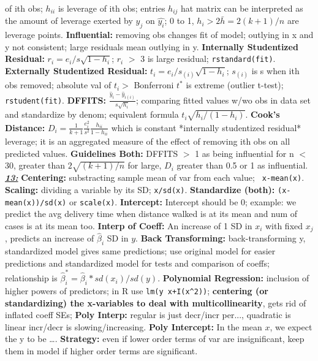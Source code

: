 \documentclass[8pt]{extarticle}
\begin{document}
of ith obs; $h_{ii}$ is leverage of ith obs; entries $h_{ij}$ hat matrix can be 
interpreted as the amount of leverage exerted by $y_j$ on $\hat{y_i}$; 
0 to 1, $h_i > 2\bar{h} = 2(k+1)/n$ are leverage points.
\textbf{Influential:} removing obs changes fit of model; outlying in x and y not
consistent; large residuals mean outlying in y.
\textbf{Internally Studentized Residual:} $r_i = e_i / s\sqrt{1 - h_{i}}$; $r_i$
$>$ 3 is large residual; \texttt{rstandard(fit)}.
\textbf{Externally Studentized Residual:} $t_i = e_i / s_{(i)}\sqrt{1 - h_{i}}$;
$s_{(i)}$ is s when ith obs removed; absolute val of 
$t_i >$ Bonferroni $t^*$ is extreme (outlier t-test); \texttt{rstudent(fit)}.
\textbf{DFFITS:} $\frac{\hat{y}_i - \hat{y}_{i(i)}}{s\sqrt{h_{i}}}$; comparing 
fitted values w/wo obs in data set and standardize by denom; equivalent formula
$t_i\sqrt{h_{i}/(1 - h_{i})}$.
\textbf{Cook's Distance:} $D_i = \frac{1}{k+1}\frac{e_i^2}{s^2}
\frac{h_{ii}}{1 - h_{ii}}$ which is constant *internally studentized residual*
leverage; it is an aggregated measure of the effect of removing ith obs on all
predicted values.
\textbf{Guidelines Both:} DFFITS $>$ 1 as being influential for n $<$ 30, 
greater than $2\sqrt{(k+1)/n}$ for large, $D_i$ greater than 0.5 or 1 as 
influential.\\

\textit{\textbf{\underline{13:}}}
\textbf{Centering:} substracting sample mean of var from each value; \texttt{
x-mean(x)}.
\textbf{Scaling:} dividing a variable by its SD; \texttt{x/sd(x)}.
\textbf{Standardize (both):} \texttt{(x-mean(x))/sd(x)} or \texttt{scale(x)}.
\textbf{Intercept:} Intercept should be 0; example: we predict the avg delivery 
time when distance walked is at its mean and num of cases is at its mean too.
\textbf{Interp of Coeff:} An increase of 1 SD in $x_i$ with fixed $x_j$, predicts 
an increase of $\hat{\beta}_i$ SD in $y$.
\textbf{Back Transforming:} back-transforming y, standardized model gives 
same predictions; use original model for easier predictions and standardized 
model for tests and comparison of coeffs; relationship is $\hat{\beta}^*_i = 
\hat{\beta}_i * sd(x_i) / sd(y)$.
\textbf{Polynomial Regression:} inclusion of higher powers of predictors; 
in R use \texttt{lm(y~x+I(x\^{}2))}; \textbf{centering (or standardizing) the 
x-variables to deal with multicollinearity}, gets rid of inflated coeff SEs;
\textbf{Poly Interp:} regular is just decr/incr per..., quadratic is linear 
incr/decr is slowing/increasing.
\textbf{Poly Intercept:} In the mean $x$, we expect the y to be \dots.
\textbf{Strategy:} even if lower order terms of var are insignificant, keep
them in model if higher order terms are significant.\\
\end{document}
